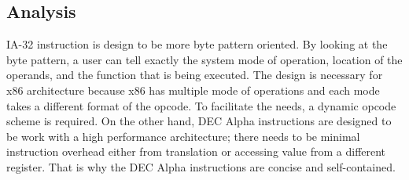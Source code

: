 \documentclass[letterpaper,10pt,titlepage]{article}
\begin{document}

\subsection{Analysis}
IA-32 instruction is design to be more byte pattern oriented. 
By looking at the byte pattern, a user can tell exactly the system mode of operation,
location of the operands, and the function that is being executed. 
The design is necessary for x86 architecture because x86 has multiple mode of operations
and each mode takes a different format of the opcode. To facilitate the needs, a dynamic
opcode scheme is required. On the other hand, DEC Alpha instructions are designed to be
work with a high performance architecture; there needs to be minimal instruction overhead 
either from translation or accessing value from a different register. That is why the 
DEC Alpha instructions are concise and self-contained.





\newpage
\nocite{*}


\end{document}
